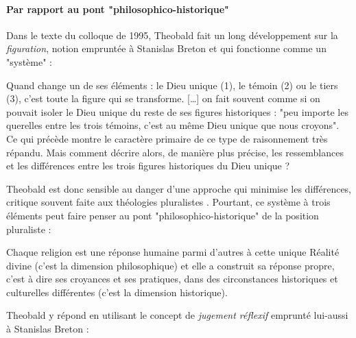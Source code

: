 \paragraph{Par rapport au pont "philosophico-historique" } Dans le texte du colloque de 1995, Theobald fait un long développement sur la \textit{figuration}, notion empruntée à Stanislas Breton et qui fonctionne comme un "système" :
\begin{singlequote}
     Quand change un de ses éléments : le Dieu unique (1), le témoin (2) ou le tiers (3), c’est toute la figure qui se transforme. [\ldots] on fait souvent comme si on pouvait isoler le Dieu unique du reste de ses figures historiques : "peu importe les querelles entre les trois témoins, c'est au même Dieu unique que nous croyons". Ce qui précède montre le caractère primaire de ce type de raisonnement très répandu. Mais comment décrire alors, de manière plus précise, les ressemblances et les différences entre les trois figures historiques du Dieu unique ?\cite{centre_sevres_paris_unique_1996}
\end{singlequote}
Theobald est donc sensible au danger   d'une approche qui minimise les différences, critique souvent faite aux théologies pluralistes \cite[p. 114]{cheno_dieu_2017}. 
Pourtant, ce système à trois éléments peut faire penser au pont "philosophico-historique" de la position pluraliste : 
\begin{singlequote}
    Chaque religion est une réponse humaine parmi d'autres à cette unique Réalité divine (c'est la dimension philosophique) et elle a construit sa réponse propre, c'est à dire ses croyances et ses pratiques, dans des circonstances historiques et culturelles différentes (c'est la dimension historique). \cite[p. 91]{cheno_dieu_2017} 
\end{singlequote}
Theobald y répond en utilisant le concept de \textit{jugement réflexif} emprunté lui-aussi à Stanislas Breton :

